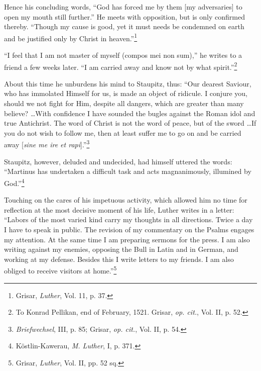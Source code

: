 Hence his concluding words, “God has forced me by them [my adversaries]
to open my mouth still further.” He meets with opposition, but is
only confirmed thereby. “Though my cause is good, yet it must needs be
condemned on earth and be justified only by Christ in heaven.”\footnote
{Grisar, \textit{Luther}, Vol. 11, p. 37.}

“I feel that I am not master of myself (compos mei non sum),” he
writes to a friend a few weeks later. “I am carried away and know not by
what spirit.”\footnote
{To Konrad Pellikan, end of February, 1521. Grisar, \textit{op. cit.}, Vol. II, p. 52.}

About this time he unburdens his mind to Staupitz, thus: “Our dearest
Saviour, who has immolated Himself for us, is made an object of ridicule.
I conjure you, should we not fight for Him, despite all dangers, which are
greater than many believe? \dots With confidence I have sounded the bugles
against the Roman idol and true Antichrist. The word of Christ is not the
word of peace, but of the sword \dots If you do not wish to follow me, then
at least suffer me to go on and be carried away [\textit{sine me ire et rapi}].”\footnote
{\textit{Briefwechsel}, III, p. 85; Grisar, \textit{op. cit.}, Vol. II, p. 54.}

Staupitz, however, deluded and undecided, had himself uttered the words:
“Martinus has undertaken a difficult task and acts magnanimously, illumined
by God.”\footnote{Köstlin-Kawerau, \textit{M. Luther}, I, p. 371.}

Touching on the cares of his impetuous activity, which allowed him no
time for reflection at the most decisive moment of his life, Luther writes
in a letter: “Labors of the most varied kind carry my thoughts in all directions.
Twice a day I have to speak in public. The revision of my commentary
on the Psalms engages my attention. At the same time I am preparing sermons
for the press. I am also writing against my enemies, opposing the Bull
in Latin and in German, and working at my defense. Besides this I write
letters to my friends. I am also obliged to receive visitors at home.”\footnote
{Grisar, \textit{Luther}, Vol. II, pp. 52 sq.}

